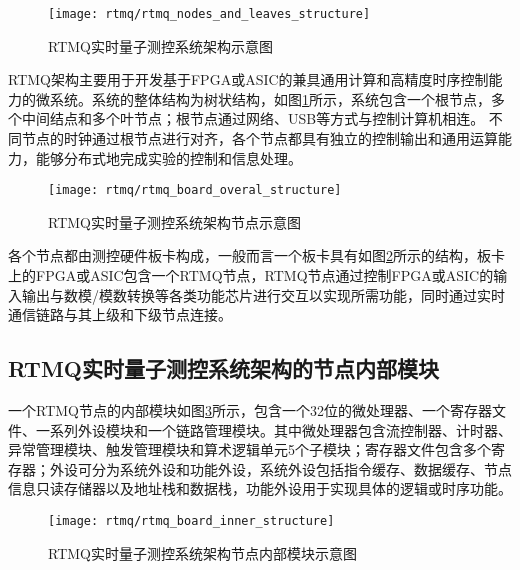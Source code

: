 \begin{figure}
    \centering
    \caption[RTMQ实时量子测控系统架构示意图]{RTMQ实时量子测控系统架构示意图\label{fig:rtmq_nodes_and_leaves_structure}}
    \texttt{[image: rtmq/rtmq\_nodes\_and\_leaves\_structure]}
\end{figure}

RTMQ架构主要用于开发基于FPGA或ASIC的兼具通用计算和高精度时序控制能力的微系统。系统的整体结构为树状结构，如图\ref{fig:rtmq_nodes_and_leaves_structure}所示，系统包含一个根节点，多个中间结点和多个叶节点；根节点通过网络、USB等方式与控制计算机相连。
不同节点的时钟通过根节点进行对齐，各个节点都具有独立的控制输出和通用运算能力，能够分布式地完成实验的控制和信息处理。

\begin{figure}
    \centering
    \caption[RTMQ实时量子测控系统架构节点示意图]{RTMQ实时量子测控系统架构节点示意图\label{fig:rtmq_board_overal_structure}}
    \texttt{[image: rtmq/rtmq\_board\_overal\_structure]}
\end{figure}

各个节点都由测控硬件板卡构成，一般而言一个板卡具有如图\ref{fig:rtmq_board_overal_structure}所示的结构，板卡上的FPGA或ASIC包含一个RTMQ节点，RTMQ节点通过控制FPGA或ASIC的输入输出与数模/模数转换等各类功能芯片进行交互以实现所需功能，同时通过实时通信链路与其上级和下级节点连接。



\subsection[RTMQ实时量子测控系统架构的节点内部模块]{RTMQ实时量子测控系统架构的节点内部模块\label{section:rtmq_inner_module}}



一个RTMQ节点的内部模块如图\ref{fig:rtmq_board_inner_structure}所示，包含一个32位的微处理器、一个寄存器文件、一系列外设模块和一个链路管理模块。其中微处理器包含流控制器、计时器、异常管理模块、触发管理模块和算术逻辑单元5个子模块；寄存器文件包含多个寄存器；外设可分为系统外设和功能外设，系统外设包括指令缓存、数据缓存、节点信息只读存储器以及地址栈和数据栈，功能外设用于实现具体的逻辑或时序功能。

\begin{figure}
    \centering
    \caption[RTMQ实时量子测控系统架构节点内部模块示意图]{RTMQ实时量子测控系统架构节点内部模块示意图\label{fig:rtmq_board_inner_structure}}
    \texttt{[image: rtmq/rtmq\_board\_inner\_structure]}
\end{figure}

